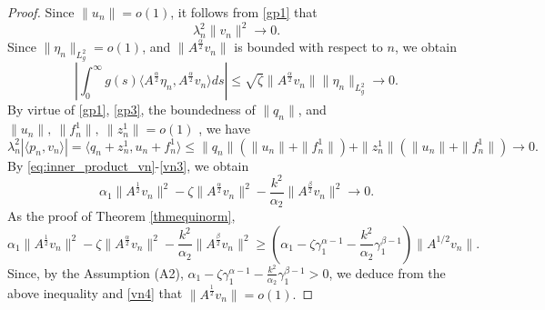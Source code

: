 \documentclass[12pt,reqno]{article}
\begin{document}
\begin{proof}
		Since $\|u_n\|=o(1)$, it follows from \eqref{gp1} that
		\begin{equation}\label{vn1}
			\lambda_n^2 \|v_n\|^2 \to0.
		\end{equation}
		Since $\|\eta_n\|_{L_g^2}=o(1)$, and $\| A^{\frac{\alpha}{2}} v_n \|$ is bounded with respect to $n$, we obtain
		\begin{equation}\label{vn2}
			\left| \int_0^\infty g(s) \langle A^{\frac{\alpha}{2}} \eta_n, A^{\frac{\alpha}{2}} v_n \rangle ds \right| \leq \sqrt{\zeta} \|A^{\frac{\alpha}{2}} v_n\|\|\eta_n\|_{L_g^2} \to 0.
		\end{equation}
		By virtue of \eqref{gp1}, \eqref{gp3}, the boundedness of $\|q_n\|$, and $\|u_n\|,~\|f_n^1\|,~\|z_n^1\|=o(1)$ , we have
		\begin{equation}\label{vn3}
			\lambda_n^2 |\langle p_n, v_n \rangle|
			=  \langle q_n+z_n^1, u_n+f_n^1 \rangle\le\|q_n\|(\|u_n\|+\|f_n^1\|)+\|z_n^1\|(\|u_n\|+\|f_n^1\|) \to 0.
		\end{equation}
		By \eqref{eq:inner_product_vn}-\eqref{vn3}, we obtain
		\begin{equation}\label{vn4}
			\alpha_1 \| A^{\frac{1}{2}} v_n \|^2
			- \zeta \| A^{\frac{\alpha}{2}} v_n \|^2
			- \frac{k^2}{\alpha_2} \| A^{\frac{\beta}{2}} v_n \|^2
			\to 0.
		\end{equation}
As the proof of Theorem \ref{thmequinorm},
$$\alpha_1 \| A^{\frac{1}{2}} v_n \|^2
			- \zeta \| A^{\frac{\alpha}{2}} v_n \|^2
			- \frac{k^2}{\alpha_2} \| A^{\frac{\beta}{2}} v_n \|^2\ge\left(\alpha_1-\zeta\gamma_1^{\alpha-1}-\frac{k^2}{\alpha_2}\gamma_1^{\beta-1}\right)\|A^{1/2}v_n\|.$$
Since, by the Assumption (A2), $\alpha_1-\zeta\gamma_1^{\alpha-1}-\frac{k^2}{\alpha_2}\gamma_1^{\beta-1}>0$, we deduce from the above inequality and \eqref{vn4} that  $\| A^{\frac{1}{2}} v_n \|=o(1).$
		

\end{proof}
\end{document}
